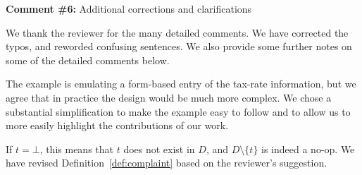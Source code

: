 
\noindent
\textbf{Comment \#6:} Additional corrections and clarifications

\smallskip

We thank the reviewer for the many detailed comments. We have corrected the
typos, and reworded confusing sentences. We also provide some further notes on
some of the detailed comments below.

\begin{quote}
\end{quote}

The example is emulating a form-based entry of the tax-rate information, but
we agree that in practice the design would be much more complex. We chose a
substantial simplification to make the example easy to follow and to allow us
to more easily highlight the contributions of our work.

% 


\begin{quote}
\end{quote}

 


\begin{quote}
\end{quote}

If $t = \bot$, this means that $t$ does not exist in $D$, and $D
\setminus\{t\}$ is indeed a no-op. We have revised
Definition~\ref{def:complaint} based on the reviewer's suggestion.


